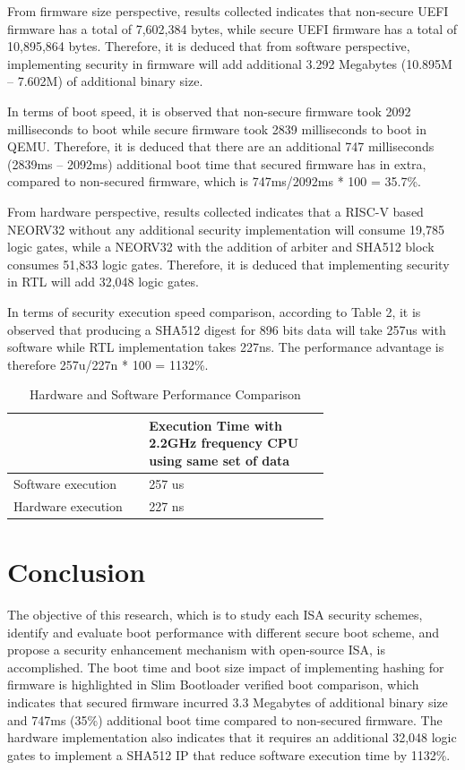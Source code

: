 \documentclass[a4paper,fleqn]{cas-dc}
\begin{document}
From firmware size perspective, results collected indicates that non-secure UEFI firmware has a total of 7,602,384 bytes, while secure UEFI firmware has a total of 10,895,864 bytes. Therefore, it is deduced that from software perspective, implementing security in firmware will add additional 3.292 Megabytes (10.895M – 7.602M) of additional binary size.

In terms of boot speed, it is observed that non-secure firmware took 2092 milliseconds to boot while secure firmware took 2839 milliseconds to boot in QEMU. Therefore, it is deduced that there are an additional 747 milliseconds (2839ms – 2092ms) additional boot time that secured firmware has in extra, compared to non-secured firmware, which is 747ms/2092ms * 100 = 35.7\%.

From hardware perspective, results collected indicates that a RISC-V based NEORV32 without any additional security implementation will consume 19,785 logic gates, while a NEORV32 with the addition of arbiter and SHA512 block consumes 51,833 logic gates. Therefore, it is deduced that implementing security in RTL will add 32,048 logic gates.

In terms of security execution speed comparison, according to Table 2, it is observed that producing a SHA512 digest for 896 bits data will take 257us with software while RTL implementation takes 227ns. The performance advantage is therefore 257u/227n * 100 = 1132\%.

\begin{table}[hbt!]
\caption{Hardware and Software Performance Comparison}
    \begin{tabular}{|p{0.3\linewidth} | p{0.4\linewidth} |}
        \hline
         & Execution Time with 2.2GHz frequency CPU using same set of data \\
        \hline 
        Software execution & 257 us  \\
        \hline
        Hardware execution & 227 ns \\
        \hline
    \end{tabular}
\end{table}

\section{ Conclusion}
The objective of this research, which is to study each ISA security schemes, identify and evaluate boot performance with different secure boot scheme, and propose a security enhancement mechanism with open-source ISA, is accomplished. The boot time and boot size impact of implementing hashing for firmware is highlighted in Slim Bootloader verified boot comparison, which indicates that secured firmware incurred 3.3 Megabytes of additional binary size and 747ms (35\%) additional boot time compared to non-secured firmware. The hardware implementation also indicates that it requires an additional 32,048 logic gates to implement a SHA512 IP that reduce software execution time by 1132\%.
\end{document}
